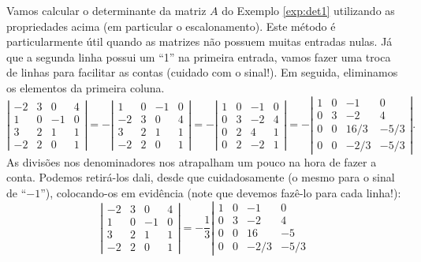 \documentclass[../livro.tex]{subfiles}  %
\begin{document}
\begin{example}
Vamos calcular o determinante da matriz $A$ do Exemplo \ref{exp:det1} utilizando as propriedades acima (em particular o escalonamento). Este método é particularmente útil quando as matrizes não possuem muitas entradas nulas. Já que a segunda linha possui um ``1'' na primeira entrada, vamos fazer uma troca de linhas para facilitar as contas (cuidado com o sinal!). Em seguida, eliminamos os elementos da primeira coluna.
\[
\left| \begin{matrix}
-2 & 3 & 0  & 4 \\
1  & 0 & -1 & 0 \\
3  & 2 & 1  & 1 \\
-2 & 2 & 0  & 1
\end{matrix}
\right| = -
\left| \begin{matrix}
1  & 0 & -1 & 0 \\
-2 & 3 & 0  & 4 \\
3  & 2 & 1  & 1 \\
-2 & 2 & 0  & 1
\end{matrix}
\right| = -
\left| \begin{matrix}
1  & 0 & -1 & 0 \\
0  & 3 & -2 & 4 \\
0  & 2 & 4  & 1 \\
0  & 2 & -2 & 1
\end{matrix}
\right| = -
\left| \begin{matrix}
1  & 0 & -1   & 0 \\
0  & 3 & -2   & 4 \\
0  & 0 & 16/3 & -5/3 \\
0  & 0 & -2/3 & -5/3
\end{matrix}
\right|.
\] As divisões nos denominadores nos atrapalham um pouco na hora de fazer a conta. Podemos retirá-los dali, desde que cuidadosamente (o mesmo para o sinal de ``$-1$''), colocando-os em evidência (note que devemos fazê-lo para cada linha!):
\[
\left| \begin{matrix}
-2 & 3 & 0  & 4 \\
1  & 0 & -1 & 0 \\
3  & 2 & 1  & 1 \\
-2 & 2 & 0  & 1
\end{matrix}
\right| = -\frac{1}{3}
\left| \begin{matrix}
1  & 0 & -1   & 0 \\
0  & 3 & -2   & 4 \\
0  & 0 & 16 & -5 \\
0  & 0 & -2/3 & -5/3

\end{matrix}\]
\end{example}
\end{document}
